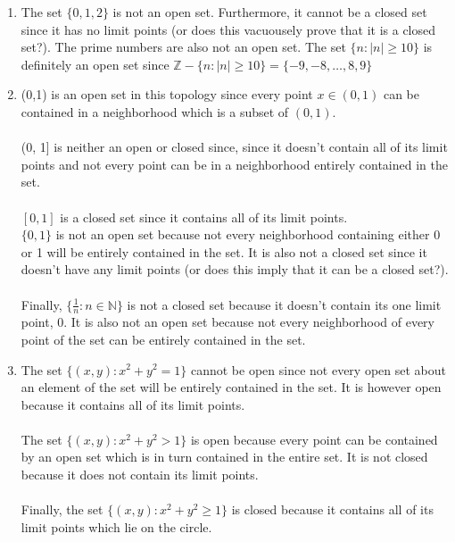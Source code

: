\documentclass[letterpaper,12pt,twoside]{maths}
\begin{document}
\begin{solution}
    \begin{enumerate}
        \item The set $\{0, 1, 2\}$ is not an open set. Furthermore, it cannot be
        a closed set since it has no limit points (or does this vacuousely
        prove that it is a closed set?). 
        The prime numbers are also not an open set. 
        The set $\{n : |n| \ge 10\}$ is definitely an open set since
        $\mathbb{Z} - \{n : |n| \ge 10\} = \{-9, -8, \dots, 8, 9\}$
    
        \item (0,1) is an open set in this topology since every point $x \in
        (0,1)$ can be contained in a neighborhood which is a subset of
        $(0,1)$.
        \\
        \\
        (0, 1] is neither an open or closed since, since it doesn't contain
        all of its limit points and not every point can be in a neighborhood
        entirely contained in the set.
        \\
        \\
        $[0,1]$ is a closed set since it contains all of its limit points.\\ 
        $\{0, 1\}$ is not an open set because not every neighborhood
        containing either 0 or 1 will be entirely contained in the set. It is
        also not a closed set since it doesn't have any limit points (or does
        this imply that it can be a closed set?). 
        \\
        \\
        Finally, $\{\frac{1}{n} : n \in \mathbb{N}\}$ is not a closed set
        because it doesn't contain its one limit point, 0. It is also not an
        open set because not every neighborhood of every point of the set can
        be entirely contained in the set.
        
        \item The set $\{(x,y) : x^2 + y^2 = 1\}$ cannot be open since not every
        open set about an element of the set will be entirely contained in the
        set. It is however open because it contains all of its limit
        points.
        \\
        \\
        The set $\{(x,y) : x^2 + y^2 > 1\}$ is open because every point can be
        contained by an open set which is in turn contained in the entire set.
        It is not closed because it does not contain its limit points.
        \\
        \\
        Finally, the set $\{(x,y) : x^2 + y^2 \ge 1\}$ is closed because it
        contains all of its limit points which lie on the circle. 
    
    \end{enumerate}
\end{solution}
\end{document}
